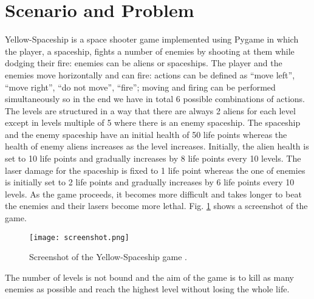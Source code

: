 \section{Scenario and Problem}

Yellow-Spaceship \cite{Yellow-Spaceship} is a space shooter game implemented using Pygame \cite{PyGame} in which the
player, a spaceship, fights a number of enemies by shooting at them while dodging their fire:
enemies can be aliens or spaceships. The player and the enemies move horizontally and
can fire: actions can be defined as “move left”, “move right”, “do not move”, “fire”; moving
and firing can be performed simultaneously so in the end we have in total 6 possible
combinations of actions. The levels are structured in a way that there are always 2 aliens for
each level except in levels multiple of 5 where there is an enemy spaceship. The spaceship
and the enemy spaceship have an initial health of 50 life points whereas the health of enemy
aliens increases as the level increases. Initially, the alien health is set to 10 life points and
gradually increases by 8 life points every 10 levels. The laser damage for the spaceship is
fixed to 1 life point whereas the one of enemies is initially set to 2 life points and gradually
increases by 6 life points every 10 levels. As the game proceeds, it becomes more difficult
and takes longer to beat the enemies and their lasers become more lethal. Fig. \ref{fig:game_screenshot} shows a
screenshot of the game.

\begin{figure}[htbp]
\centerline{\texttt{[image: screenshot.png]}}
\caption{Screenshot of the Yellow-Spaceship game \cite{Yellow-Spaceship}.}
\label{fig:game_screenshot}
\end{figure}

The number of levels is not bound and the aim of the game is to kill as many enemies as
possible and reach the highest level without losing the whole life.